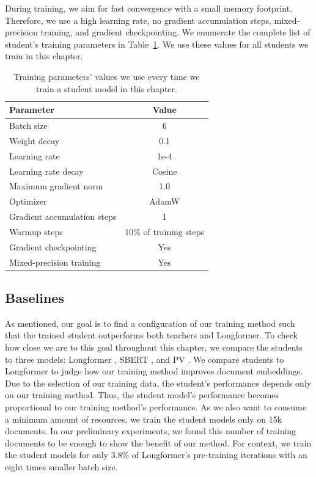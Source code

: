 During training, we aim for fast convergence with a small memory footprint.
Therefore, we use a high learning rate, no gradient accumulation steps,
mixed-precision training, and gradient checkpointing. We enumerate the complete
list of student's training parameters in
Table~\ref{table:student_train_params}. We use these values for all students we
train in this chapter.


\begin{table}
  \centering
  \footnotesize

  \begin{tabular}{l c}
    \toprule
    Parameter & Value \\
    \midrule
    Batch size & 6 \\
    Weight decay & 0.1 \\
    Learning rate & 1e-4 \\
    Learning rate decay & Cosine \\
    Maximum gradient norm & 1.0 \\
    Optimizer & AdamW \\
    Gradient accumulation steps & 1 \\
    Warmup steps & 10\% of training steps \\
    Gradient checkpointing & Yes \\
    Mixed-precision training & Yes \\
    \bottomrule
  \end{tabular}

  \caption{Training parameters' values we use every time we train a student
  model in this chapter.}

  \label{table:student_train_params}

\end{table}

\subsection{Baselines}

As mentioned, our goal is to find a configuration of our training method such
that the trained student outperforms both teachers and Longformer. To check how
close we are to this goal throughout this chapter, we compare the students to
three models: Longformer \citep{beltagy2020longformer}, SBERT
\citep{reimers2019sentence}, and PV \citep{le2014distributed}. We compare
students to Longformer to judge how our training method improves document
embeddings. Due to the selection of our training data, the student's
performance depends only on our training method. Thus, the student model's
performance becomes proportional to our training method's performance. As we
also want to consume a minimum amount of resources, we train the student models
only on 15k documents. In our preliminary experiments, we found this number of
training documents to be enough to show the benefit of our method. For context,
we train the student models for only 3.8\% of Longformer's pre-training
iterations with an eight times smaller batch size.


